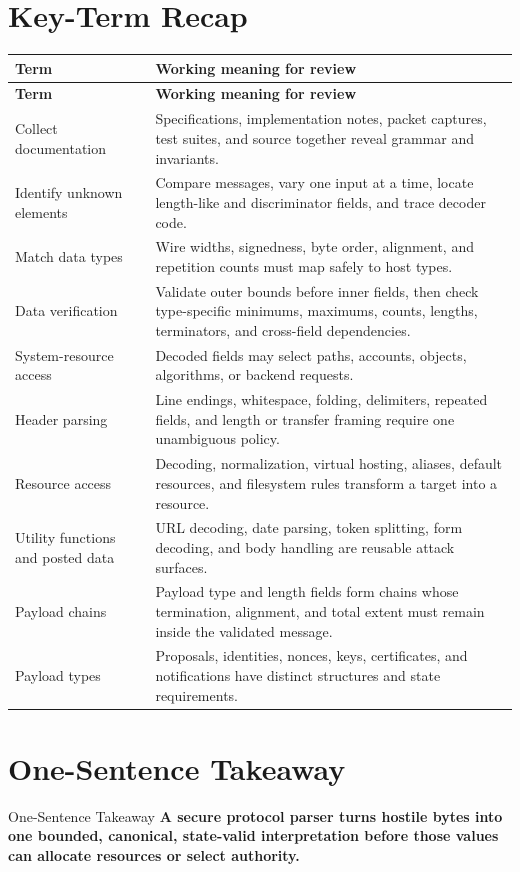 \documentclass[11pt,letterpaper]{article}
\begin{document}
\section{Key-Term Recap}
\begin{longtable}{>{\raggedright\arraybackslash}p{}p{}}
\toprule
\textbf{Term} & \textbf{Working meaning for review} \\
\midrule
\endfirsthead
\toprule
\textbf{Term} & \textbf{Working meaning for review} \\
\midrule
\endhead
Collect documentation & Specifications, implementation notes, packet captures, test suites, and source together reveal grammar and invariants. \\
Identify unknown elements & Compare messages, vary one input at a time, locate length-like and discriminator fields, and trace decoder code. \\
Match data types & Wire widths, signedness, byte order, alignment, and repetition counts must map safely to host types. \\
Data verification & Validate outer bounds before inner fields, then check type-specific minimums, maximums, counts, lengths, terminators, and cross-field dependencies. \\
System-resource access & Decoded fields may select paths, accounts, objects, algorithms, or backend requests. \\
Header parsing & Line endings, whitespace, folding, delimiters, repeated fields, and length or transfer framing require one unambiguous policy. \\
Resource access & Decoding, normalization, virtual hosting, aliases, default resources, and filesystem rules transform a target into a resource. \\
Utility functions and posted data & URL decoding, date parsing, token splitting, form decoding, and body handling are reusable attack surfaces. \\
Payload chains & Payload type and length fields form chains whose termination, alignment, and total extent must remain inside the validated message. \\
Payload types & Proposals, identities, nonces, keys, certificates, and notifications have distinct structures and state requirements. \\
\bottomrule
\end{longtable}
\section{One-Sentence Takeaway}
\begin{CornellExamBox}{One-Sentence Takeaway}
\textbf{A secure protocol parser turns hostile bytes into one bounded, canonical, state-valid interpretation before those values can allocate resources or select authority.}
\end{CornellExamBox}
\end{document}
